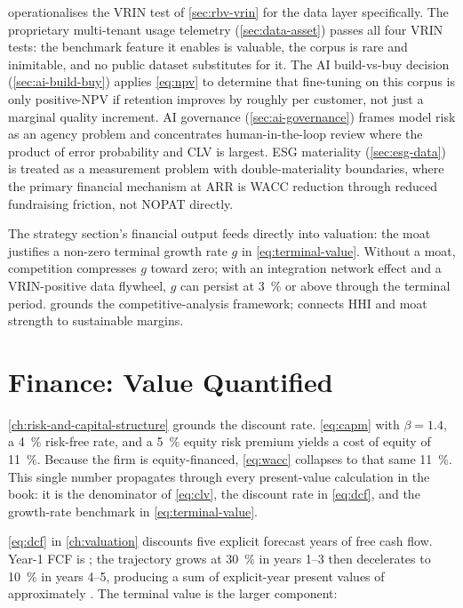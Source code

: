  operationalises the VRIN test of \cref{sec:rbv-vrin} for the
data layer specifically. The proprietary multi-tenant usage telemetry (\cref{sec:data-asset})
passes all four VRIN tests: the benchmark feature it enables is valuable, the corpus is rare
and inimitable, and no public dataset substitutes for it. The AI build-vs-buy decision
(\cref{sec:ai-build-buy}) applies \cref{eq:npv} to determine that fine-tuning on this corpus
is only positive-NPV if retention improves by roughly  per customer, not just a
marginal quality increment. AI governance (\cref{sec:ai-governance}) frames model risk as an
agency problem and concentrates human-in-the-loop review where the product of error probability
and CLV is largest. ESG materiality (\cref{sec:esg-data}) is treated as a measurement problem
with double-materiality boundaries, where the primary financial mechanism at 
ARR is WACC reduction through reduced fundraising friction, not NOPAT directly.

The strategy section's financial output feeds directly into valuation: the moat justifies
a non-zero terminal growth rate $g$ in \cref{eq:terminal-value}. Without a moat,
competition compresses $g$ toward zero; with an integration network effect and a
VRIN-positive data flywheel, $g$ can persist at \qty{3}{\percent} or above through the
terminal period. \textcite{porter1985} grounds the competitive-analysis framework;
\textcite{dranove7theconomics} connects HHI and moat strength to sustainable margins.

\section{Finance: Value Quantified}\label{sec:capstone-finance}

\cref{ch:risk-and-capital-structure} grounds the discount rate. \cref{eq:capm} with
\(\beta=1.4\), a \qty{4}{\percent} risk-free rate, and a \qty{5}{\percent} equity risk
premium yields a cost of equity of \qty{11}{\percent}. Because the firm is equity-financed,
\cref{eq:wacc} collapses to that same \qty{11}{\percent}. This single number propagates
through every present-value calculation in the book: it is the denominator of \cref{eq:clv},
the discount rate in \cref{eq:dcf}, and the growth-rate benchmark in \cref{eq:terminal-value}.

\cref{eq:dcf} in \cref{ch:valuation} discounts five explicit forecast years of free cash
flow. Year-1 FCF is ; the trajectory grows at \qty{30}{\percent} in years 1--3
then decelerates to \qty{10}{\percent} in years 4--5, producing a sum of explicit-year
present values of approximately . The terminal value is the larger component:

